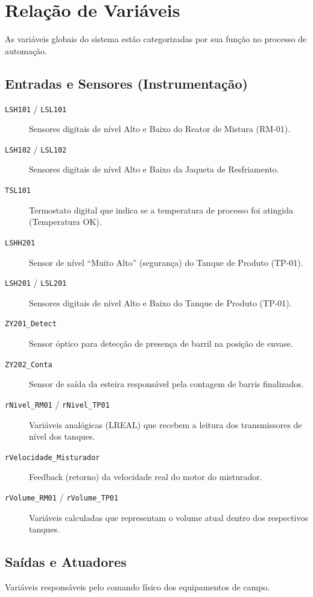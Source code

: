 \section{Relação de Variáveis}\label{sec:var-relations}

As variáveis globais do sistema estão categorizadas por sua função no processo de automação.

\subsection{Entradas e Sensores (Instrumentação)}


\begin{description}
    \item[\texttt{LSH101} / \texttt{LSL101}] Sensores digitais de nível Alto e Baixo do Reator de Mistura (RM-01).
    \item[\texttt{LSH102} / \texttt{LSL102}] Sensores digitais de nível Alto e Baixo da Jaqueta de Resfriamento.
    \item[\texttt{TSL101}] Termostato digital que indica se a temperatura de processo foi atingida (Temperatura OK).
    \item[\texttt{LSHH201}] Sensor de nível ``Muito Alto'' (segurança) do Tanque de Produto (TP-01).
    \item[\texttt{LSH201} / \texttt{LSL201}] Sensores digitais de nível Alto e Baixo do Tanque de Produto (TP-01).
    \item[\texttt{ZY201\_Detect}] Sensor óptico para detecção de presença de barril na posição de envase.
    \item[\texttt{ZY202\_Conta}] Sensor de saída da esteira responsável pela contagem de barris finalizados.
    \item[\texttt{rNivel\_RM01} / \texttt{rNivel\_TP01}] Variáveis analógicas (LREAL) que recebem a leitura dos transmissores de nível dos tanques.
    \item[\texttt{rVelocidade\_Misturador}] Feedback (retorno) da velocidade real do motor do misturador.
    \item[\texttt{rVolume\_RM01} / \texttt{rVolume\_TP01}] Variáveis calculadas que representam o volume atual dentro dos respectivos tanques.
\end{description}

\subsection{Saídas e Atuadores}
Variáveis responsáveis pelo comando físico dos equipamentos de campo.

